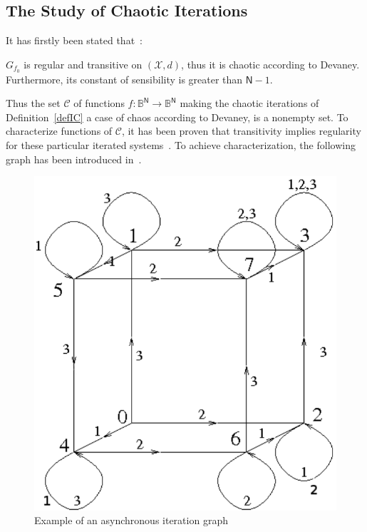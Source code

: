 \subsection{The Study of Chaotic Iterations}

It has firstly been stated that~\cite{gb11:bc,GuyeuxThese10}:

\begin{theorem}
    $G_{f_0}$ is regular and transitive on $(\mathcal{X},d)$, thus it is 
    chaotic according to Devaney. 
Furthermore, its constant of sensibility is greater than $\mathsf{N}-1$.
\end{theorem}

Thus the set $\mathcal{C}$ of functions $f:\mathds{B}^\mathsf{N} 
\longrightarrow \mathds{B}^\mathsf{N}$ making the chaotic iterations of 
Definition~\ref{defIC} a case of chaos according to Devaney, is a nonempty
set. To characterize functions of $\mathcal{C}$, it has been proven
that transitivity implies regularity for these particular iterated 
systems~\cite{bcgr11:ip}. To achieve characterization,  the
following graph  has been introduced in~\cite{gb11:bc,GuyeuxThese10}.

\begin{figure}
    \centering
   \includegraphics[scale=0.55]{grapheTPICver2.pdf}
   \caption{Example of an asynchronous iteration graph}
   \label{GTPIC}
   \end{figure}



